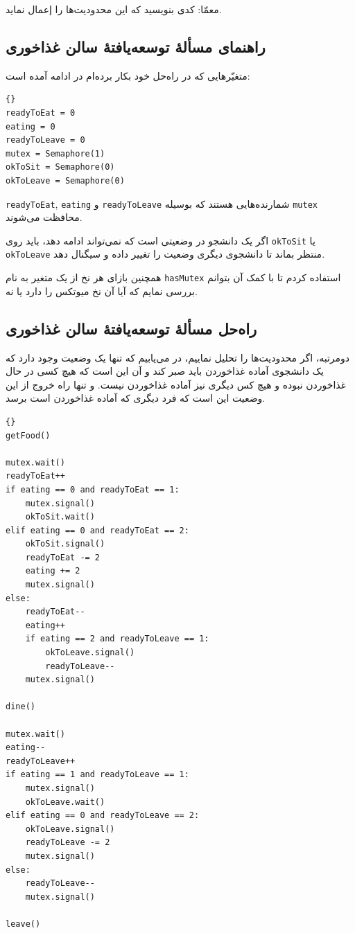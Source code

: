 \documentclass{book}
\newcommand{\clearemptydoublepage}{\newpage\cleardoublepage}
\begin{document}
    معمّا: کدی بنویسید که این محدودیت‌ها را إعمال نماید. 


\clearemptydoublepage
\subsection{راهنمای مسألهٔ توسعه‌یافتهٔ سالن غذاخوری}

    متغیّرهایی که در راه‌حل خود بکار برده‌ام در ادامه آمده است:‌

\begin{latin}
\begin{lstlisting}[title=\rl{راهنمای مسألهٔ توسعه‌یافتهٔ سالن غذاخوری}]{}
readyToEat = 0
eating = 0
readyToLeave = 0
mutex = Semaphore(1)
okToSit = Semaphore(0)
okToLeave = Semaphore(0)
\end{lstlisting}
\end{latin}

    {\tt readyToEat}, {\tt eating} و {\tt readyToLeave} 
    شمارنده‌هایی هستند که بوسیله {\tt mutex} محافظت می‌شوند. 

    اگر یک دانشجو در وضعیتی است که نمی‌تواند ادامه دهد، باید روی {\tt okToSit} یا {\tt okToLeave} منتظر بماند تا دانشجوی دیگری 
    وضعیت را تغییر داده و سیگنال دهد. 

    همچنین بازای هر نخ از یک متغیر به نام {\tt hasMutex} استفاده کردم تا با کمک آن بتوانم بررسی نمایم که آیا آن نخ میوتکس را دارد یا نه. 

\clearemptydoublepage
\subsection{راه‌حل مسألهٔ توسعه‌یافتهٔ سالن غذاخوری}

    دومرتبه، اگر محدودیت‌ها را تحلیل نماییم، در می‌یابیم که تنها یک وضعیت وجود دارد که یک دانشجوی آماده غذاخوردن باید صبر کند و آن این است که 
    هیچ کسی در حال غذاخوردن نبوده و هیچ کس دیگری نیز آماده غذاخوردن نیست. و تنها راه خروج از این وضعیت این است که فرد دیگری که آماده غذاخوردن است 
    برسد. 

\begin{latin}
\begin{lstlisting}[title=\rl{راه‌حل مسألهٔ توسعه‌یافتهٔ سالن غذاخوری}]{}
getFood()

mutex.wait()
readyToEat++
if eating == 0 and readyToEat == 1:
    mutex.signal()
    okToSit.wait()
elif eating == 0 and readyToEat == 2:
    okToSit.signal()
    readyToEat -= 2
    eating += 2
    mutex.signal()
else:
    readyToEat--
    eating++
    if eating == 2 and readyToLeave == 1:
        okToLeave.signal()
        readyToLeave--
    mutex.signal()

dine()

mutex.wait()
eating--
readyToLeave++
if eating == 1 and readyToLeave == 1:
    mutex.signal()
    okToLeave.wait()
elif eating == 0 and readyToLeave == 2:
    okToLeave.signal()
    readyToLeave -= 2
    mutex.signal()
else:
    readyToLeave--
    mutex.signal()

leave()
\end{lstlisting}
\end{latin}
\end{document}
